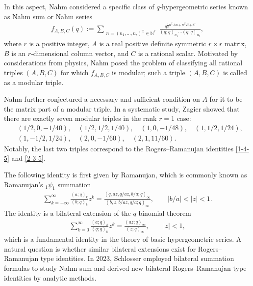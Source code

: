 \documentclass[10pt,a4paper]{amsart}
\numberwithin{equation}{section}
\theoremstyle{definition}
\begin{document}
In this aspect, Nahm \cite{Nahm-1994,Nahm-1995,Nahm-2007} considered a specific class of $q$-hypergeometric series known as Nahm sum or Nahm series
\begin{align*}
f_{A,B,C}(q) := \sum_{\substack{n=(n_1, \dots, n_r)^{\mathrm{T}} \in \mathbb{N}^r}} \frac{q^{\frac{1}{2} n^{\mathrm{T}} A n + n^{\mathrm{T}} B + C}}{(q; q)_{n_1} \cdots (q; q)_{n_r}},
\end{align*}
where $r$ is a positive integer, $A$ is a real positive definite symmetric $r\times r$ matrix, $B$ is an $r$\nobreakdash-di\-men\-sional column vector, and $C$ is a rational scalar. Motivated by considerations from physics, Nahm \cite{Nahm-2007} posed the problem of classifying all rational triples $(A, B, C)$ for which $f_{A,B,C}$ is modular; such a triple $(A,B,C)$ is called as a modular triple.\par
Nahm further conjectured a necessary and sufficient condition on $A$ for it to be the matrix part of a modular triple. In a systematic study, Zagier \cite{Zagier-2007} showed that there are exactly seven modular triples in the rank $r=1$ case:
\begin{align*}
& (1/2,0,-1/40), \quad (1/2,1/2,1/40), \quad (1,0,-1/48), \quad (1,1/2,1/24),\\
& (1,-1/2,1/24),  \quad (2,0,-1/60), \quad (2,1,11/60).
\end{align*}
Notably, the last two triples correspond to the Rogers--Ramanujan identities \eqref{1-4-5} and \eqref{2-3-5}.\par
The following identity is first given by Ramanujan, which is commonly known as Ramanujan's $_1\psi_1$ summation \cite[Appendix~II.29]{red}
\begin{align}\label{1psi1}
 \sum_{k=-\infty}^{\infty} \frac{(a; q)_k}{(b; q)_k} z^k = \frac{(q, az, q/az, b/a; q)_{\infty}}{(b, z, b/az, q/a; q)_{\infty}}, \qquad |b/a| < |z| < 1.
\end{align}
The identity is a bilateral extension of the $q$-binomial theorem \cite[Appendix~II.3]{red}
\begin{align*}
 \sum_{k=0}^{\infty} \frac{(a; q)_k}{(q; q)_k} z^k = \frac{(az; q)_{\infty}}{(z; q)_{\infty}}, \qquad |z| < 1,
\end{align*}
which is a fundamental identity in the theory of basic hypergeometric series. A natural question is whether similar bilateral extensions exist for Rogers--Ramanujan type identities. In 2023, Schlosser \cite{Schlosser-2023} employed bilateral summation formulas to study Nahm sum and derived new bilateral Rogers--Ramanujan type identities by analytic methods.\par
\end{document}
